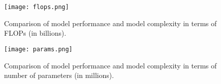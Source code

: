 \documentclass{article}
\begin{document}
\begin{figure}
    \centering
    \texttt{[image: flops.png]}
    \caption{Comparison of model performance and model complexity in terms of FLOPs (in billions).}
  \label{fig:flops}
\end{figure}

\begin{figure}
    \centering
    \texttt{[image: params.png]}
    \caption{Comparison of model performance and model complexity in terms of number of parameters (in millions).}
    \label{fig:params}
\end{figure}
\end{document}

